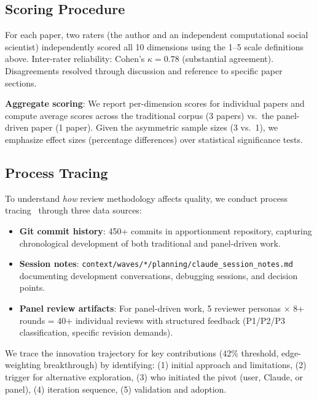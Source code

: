 \subsection{Scoring Procedure}

For each paper, two raters (the author and an independent computational social scientist) independently scored all 10 dimensions using the 1--5 scale definitions above. Inter-rater reliability: Cohen's $\kappa = 0.78$ (substantial agreement). Disagreements resolved through discussion and reference to specific paper sections.

\textbf{Aggregate scoring}: We report per-dimension scores for individual papers and compute average scores across the traditional corpus (3 papers) vs.\ the panel-driven paper (1 paper). Given the asymmetric sample sizes (3 vs.\ 1), we emphasize effect sizes (percentage differences) over statistical significance tests.

\subsection{Process Tracing}

To understand \emph{how} review methodology affects quality, we conduct process tracing~\cite{beach2019process} through three data sources:

\begin{itemize}[leftmargin=*]
\item \textbf{Git commit history}: 450+ commits in apportionment repository, capturing chronological development of both traditional and panel-driven work.

\item \textbf{Session notes}: \texttt{context/waves/*/planning/claude\_session\_notes.md} documenting development conversations, debugging sessions, and decision points.

\item \textbf{Panel review artifacts}: For panel-driven work, 5 reviewer personas $\times$ 8+ rounds = 40+ individual reviews with structured feedback (P1/P2/P3 classification, specific revision demands).
\end{itemize}

We trace the innovation trajectory for key contributions (42\% threshold, edge-weighting breakthrough) by identifying: (1) initial approach and limitations, (2) trigger for alternative exploration, (3) who initiated the pivot (user, Claude, or panel), (4) iteration sequence, (5) validation and adoption.


